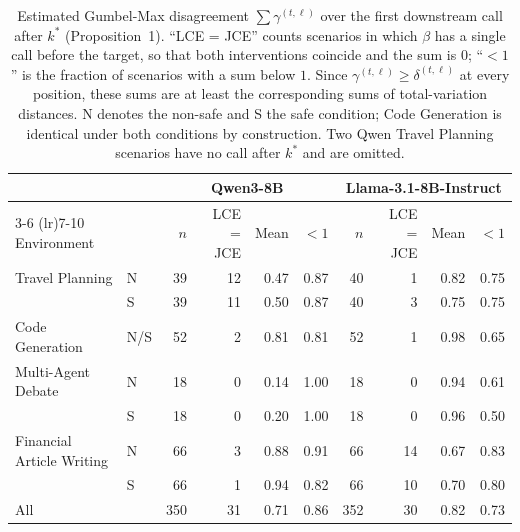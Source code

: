\begin{table}[t]
\centering
\caption{Estimated Gumbel-Max disagreement $\sum \gamma^{(t,\ell)}$ over the first downstream call after $k^*$ (Proposition~1). ``LCE = JCE'' counts scenarios in which $\beta$ has a single call before the target, so that both interventions coincide and the sum is $0$; ``$<1$'' is the fraction of scenarios with a sum below $1$. Since $\gamma^{(t,\ell)} \ge \delta^{(t,\ell)}$ at every position, these sums are at least the corresponding sums of total-variation distances. N denotes the non-safe and S the safe condition; Code Generation is identical under both conditions by construction. Two Qwen Travel Planning scenarios have no call after $k^*$ and are omitted.}
\label{tab:prefix-sensitivity}
\small
\begin{tabular}{llrrrrrrrr}
\toprule
 & & \multicolumn{4}{c}{Qwen3-8B} & \multicolumn{4}{c}{Llama-3.1-8B-Instruct} \\
\cmidrule(lr){3-6} \cmidrule(lr){7-10}
Environment & & $n$ & LCE = JCE & Mean & $<1$ & $n$ & LCE = JCE & Mean & $<1$ \\
\midrule
Travel Planning & N & 39 & 12 & 0.47 & 0.87 & 40 & 1 & 0.82 & 0.75 \\
 & S & 39 & 11 & 0.50 & 0.87 & 40 & 3 & 0.75 & 0.75 \\
Code Generation & N/S & 52 & 2 & 0.81 & 0.81 & 52 & 1 & 0.98 & 0.65 \\
Multi-Agent Debate & N & 18 & 0 & 0.14 & 1.00 & 18 & 0 & 0.94 & 0.61 \\
 & S & 18 & 0 & 0.20 & 1.00 & 18 & 0 & 0.96 & 0.50 \\
Financial Article Writing & N & 66 & 3 & 0.88 & 0.91 & 66 & 14 & 0.67 & 0.83 \\
 & S & 66 & 1 & 0.94 & 0.82 & 66 & 10 & 0.70 & 0.80 \\
\midrule
All & & 350 & 31 & 0.71 & 0.86 & 352 & 30 & 0.82 & 0.73 \\
\bottomrule
\end{tabular}
\end{table}
